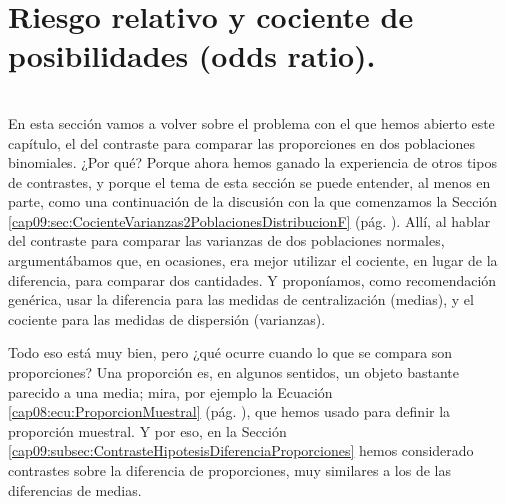 \section{Riesgo relativo y cociente de posibilidades (odds ratio).}
\label{cap09:sec:RiesgoRelativoCocienteProbabilidades}
\\

En esta sección vamos a volver sobre el problema con el que hemos abierto este capítulo, el del contraste para comparar las proporciones en dos poblaciones binomiales. ¿Por qué? Porque ahora hemos ganado la experiencia de otros tipos de contrastes, y porque el tema de esta sección se puede entender, al menos en parte, como una continuación de la discusión con la que comenzamos la Sección \ref{cap09:sec:CocienteVarianzas2PoblacionesDistribucionF} (pág. \pageref{cap09:sec:CocienteVarianzas2PoblacionesDistribucionF}). Allí, al hablar del contraste para comparar las varianzas de dos poblaciones normales, argumentábamos que, en ocasiones, era mejor utilizar el cociente, en lugar de la diferencia, para comparar dos cantidades. Y proponíamos, como recomendación genérica, usar la diferencia para las medidas de centralización (medias), y el cociente para las medidas de dispersión (varianzas).

Todo eso está muy bien, pero ¿qué ocurre cuando lo que se compara son proporciones? Una proporción es, en algunos sentidos, un objeto bastante parecido a una media; mira, por ejemplo la Ecuación \ref{cap08:ecu:ProporcionMuestral} (pág. \pageref{cap08:ecu:ProporcionMuestral}), que hemos usado para definir la proporción muestral. Y por eso, en la Sección \ref{cap09:subsec:ContrasteHipotesisDiferenciaProporciones} hemos considerado contrastes sobre la diferencia de proporciones, muy similares a los de las diferencias de medias.


